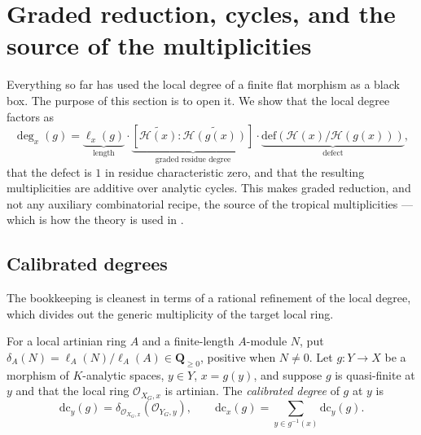 \section{Graded reduction, cycles, and the source of the multiplicities}
\label{sec:trop-graded}

Everything so far has used the local degree of a finite flat morphism as a
black box. The purpose of this section is to open it. We show that the
local degree factors as
\[
 \deg_x(g)=\underbrace{\ell_x(g)}_{\text{length}}\cdot
 \underbrace{[\widetilde{\mathcal H(x)}:\widetilde{\mathcal H(g(x))}]}
 _{\text{graded residue degree}}\cdot
 \underbrace{\mathrm{def}(\mathcal H(x)/\mathcal H(g(x)))}_{\text{defect}},
\]
that the defect is $1$ in residue characteristic zero, and that the
resulting multiplicities are additive over analytic cycles. This makes
graded reduction, and not any auxiliary combinatorial recipe, the source of
the tropical multiplicities --- which is how the theory is used in
.

\subsection{Calibrated degrees}

The bookkeeping is cleanest in terms of a rational refinement of the local
degree, which divides out the generic multiplicity of the target local ring.

\begin{definition}
\label{def:trop-calibrated-degree}
For a local artinian ring $A$ and a finite-length $A$-module $N$, put
$\delta_A(N)=\ell_A(N)/\ell_A(A)\in\mathbf Q_{\ge0}$, positive when $N\ne0$. Let $g:Y\to X$ be a
morphism of $K$-analytic spaces, $y\in Y$, $x=g(y)$, and suppose $g$ is
quasi-finite at $y$ and that the local ring $\mathcal O_{X_G,x}$ is
artinian. The \emph{calibrated degree} of $g$ at $y$ is
\[
 \mathrm{dc}_y(g)=\delta_{\mathcal O_{X_G,x}}(\mathcal O_{Y_G,y}),
 \qquad
 \mathrm{dc}_x(g)=\sum_{y\in g^{-1}(x)}\mathrm{dc}_y(g).
\]
\end{definition}

